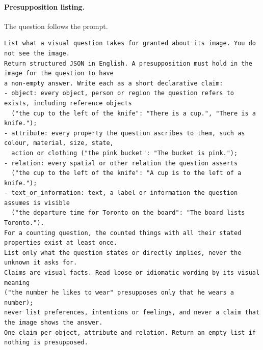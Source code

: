 \documentclass{article}
\begin{document}
\paragraph{Presupposition listing.}
The question follows the prompt.
\begin{lstlisting}
List what a visual question takes for granted about its image. You do not see the image.
Return structured JSON in English. A presupposition must hold in the image for the question to have
a non-empty answer. Write each as a short declarative claim:
- object: every object, person or region the question refers to exists, including reference objects
  ("the cup to the left of the knife": "There is a cup.", "There is a knife.");
- attribute: every property the question ascribes to them, such as colour, material, size, state,
  action or clothing ("the pink bucket": "The bucket is pink.");
- relation: every spatial or other relation the question asserts
  ("the cup to the left of the knife": "A cup is to the left of a knife.");
- text_or_information: text, a label or information the question assumes is visible
  ("the departure time for Toronto on the board": "The board lists Toronto.").
For a counting question, the counted things with all their stated properties exist at least once.
List only what the question states or directly implies, never the unknown it asks for.
Claims are visual facts. Read loose or idiomatic wording by its visual meaning
("the number he likes to wear" presupposes only that he wears a number);
never list preferences, intentions or feelings, and never a claim that the image shows the answer.
One claim per object, attribute and relation. Return an empty list if nothing is presupposed.
\end{lstlisting}
\end{document}
